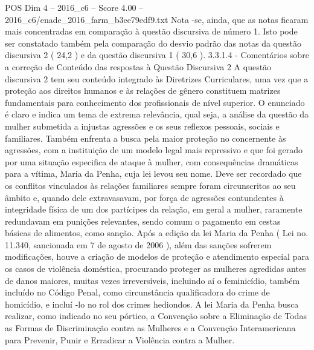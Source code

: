 \begin{textsample}{POS Dim 4 – 2016\_c6 – Score 4.00 – 2016\_c6/enade\_2016\_farm\_b3ee79edf9.txt}
Nota -se, ainda, que as notas ficaram mais concentradas em comparação à questão discursiva de número 1.
Isto pode ser constatado também pela comparação do desvio padrão das notas da questão discursiva 2 ( 24,2 ) e da questão discursiva 1 ( 30,6 ). 3.3.1.4 - Comentários sobre a correção de Conteúdo das respostas à Questão Discursiva 2 A questão discursiva 2 tem seu conteúdo integrado às Diretrizes Curriculares, uma vez que a proteção aos direitos humanos e às relações de gênero constituem matrizes fundamentais para conhecimento dos profissionais de nível superior.
O enunciado é claro e indica um tema de extrema relevância, qual seja, a análise da questão da mulher submetida a injustas agressões e os seus reflexos pessoais, sociais e familiares.
Também enfrenta a busca pela maior proteção no concernente às agressões, com a instituição de um modelo legal mais repressivo e que foi gerado por uma situação especifica de ataque à mulher, com consequências dramáticas para a vítima, Maria da Penha, cuja lei levou seu nome.
Deve ser recordado que os conflitos vinculados às relações familiares sempre foram circunscritos ao seu âmbito e, quando dele extravasavam, por força de agressões contundentes à integridade física de um dos partícipes da relação, em geral a mulher, raramente redundavam em punições relevantes, sendo comum o pagamento em cestas básicas de alimentos, como sanção.
Após a edição da lei Maria da Penha ( Lei no. 11.340, sancionada em 7 de agosto de 2006 ), além das sanções sofrerem modificações, houve a criação de modelos de proteção e atendimento especial para os casos de violência doméstica, procurando proteger as mulheres agredidas antes de danos maiores, muitas vezes irreversíveis, incluindo aí o feminicídio, também incluído no Código Penal, como circunstância qualificadora do crime de homicídio, e incluí -lo no rol dos crimes hediondos.
A lei Maria da Penha busca realizar, como indicado no seu pórtico, a Convenção sobre a Eliminação de Todas as Formas de Discriminação contra as Mulheres e a Convenção Interamericana para Prevenir, Punir e Erradicar a Violência contra a Mulher.

\end{textsample}
